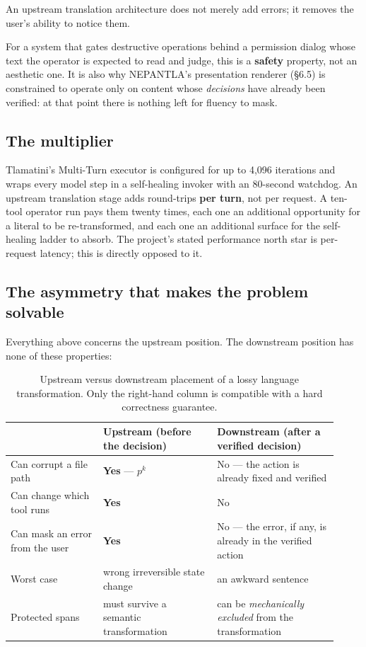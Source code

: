 \begin{keyinsight}
An upstream translation architecture does not merely add errors; it removes the
user's ability to notice them.
\end{keyinsight}

For a system that gates destructive operations behind a permission dialog whose
text the operator is expected to read and judge, this is a \textbf{safety}
property, not an aesthetic one. It is also why NEPANTLA's presentation renderer
(\S6.5) is constrained to operate only on content whose \emph{decisions} have
already been verified: at that point there is nothing left for fluency to mask.

\subsection{The multiplier}
\label{sec:multiplier}

Tlamatini's Multi-Turn executor is configured for up to 4{,}096 iterations and
wraps every model step in a self-healing invoker with an 80-second watchdog. An
upstream translation stage adds round-trips \textbf{per turn}, not per request. A
ten-tool operator run pays them twenty times, each one an additional opportunity
for a literal to be re-transformed, and each one an additional surface for the
self-healing ladder to absorb. The project's stated performance north star is
per-request latency; this is directly opposed to it.

\subsection{The asymmetry that makes the problem solvable}
\label{sec:asymmetry}

Everything above concerns the upstream position. The downstream position has none
of these properties:

\begin{table}[htbp]
\centering
\small
\caption{Upstream versus downstream placement of a lossy language
transformation. Only the right-hand column is compatible with a hard correctness
guarantee.}
\label{tab:upstream-downstream}
\begin{tabular}{@{}p{0.26\linewidth}p{0.32\linewidth}p{0.34\linewidth}@{}}
\toprule
 & \textbf{Upstream} (before the decision) & \textbf{Downstream} (after a verified decision) \\
\midrule
Can corrupt a file path & \textbf{Yes} --- $p^{k}$ & No --- the action is already fixed and verified \\
Can change which tool runs & \textbf{Yes} & No \\
Can mask an error from the user & \textbf{Yes} & No --- the error, if any, is already in the verified action \\
Worst case & wrong irreversible state change & an awkward sentence \\
Protected spans & must survive a semantic transformation & can be \emph{mechanically excluded} from the transformation \\
\bottomrule
\end{tabular}
\end{table}

